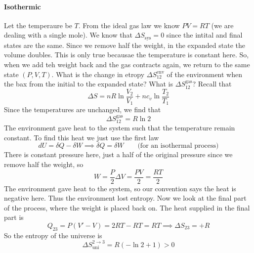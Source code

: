 \documentclass{report}
\numberwithin{equation}{section}
\begin{document}
\paragraph{Isothermic} Let the temperaure be $T$. From the ideal gas law we know $PV = RT$ (we are dealing with a single mole). We know that $\Delta S_{\text{sys}} = 0$ since the intital and final states are the same. Since we remove half the weight, in the expanded state the volume doubles. This is only true 
becausae the temperature is constant here. So, when we add teh weight back and the gas contracts again, we return to the same state $(P,V,T)$. What is the change in etropy $\Delta S^{\text{env}}_{12}$ of the environment when the bax from the initial to the expanded state? What is $\Delta S^{\text{gas}}_{12}$? Recall that 
$$\Delta S = nR\ln\frac{V_2}{V_1}+nc_v\ln\frac{T_2}{T_1}$$
Since the temperatures are unchanged, we find that 
$$\Delta S^{\text{gas}}_{12} = R\ln 2$$
The environment gave heat to the system such that the temperature remain constant. To find this heat we just use the first law 
$$dU = \delta Q - \delta W \implies \delta Q = \delta W \qquad \text{(for an isothermal process)}$$
There is constant pressure here, just a half of the original pressure since we remove half the weight, so 
$$W = \frac{P}{2}\Delta V = \frac{PV}{2} = \frac{RT}{2}$$
The environment gave heat to the system, so our convention says the heat is negative here. Thus the environment lost entropy. Now we look at the final part of the process, where the weight is placed back on. The heat supplied in the final part is 
$$Q_{23} = P(V' - V) = 2RT - RT = RT \implies \Delta S_{23} = +R$$
So the entropy of the universe is 
$$\Delta S^{2\rightarrow 3}_{\text{uni}} = R(-\ln 2 + 1) > 0$$
\end{document}
